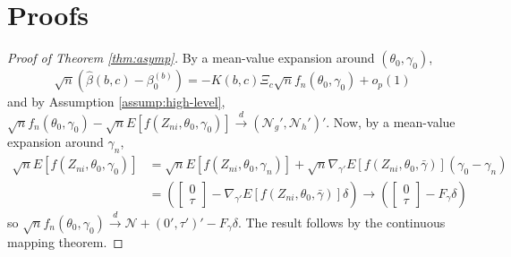 \section*{Proofs}
\begin{proof}[Proof of Theorem \ref{thm:asymp}]
By a mean-value expansion around $(\theta_0,\gamma_0)$,
	$$\sqrt{n}\left(\widehat{\beta}(b,c) - \beta_0^{(b)}\right) = - K(b,c)\Xi_c \sqrt{n} f_n(\theta_0,\gamma_0) + o_p(1)$$
  and by Assumption \ref{assump:high-level},
$\sqrt{n} f_n(\theta_0, \gamma_0) - \sqrt{n}E\left[f(Z_{ni},\theta_0, \gamma_0) \right]\overset{d}{\rightarrow} (\mathscr{N}_g', \mathscr{N}_h')'$. 
Now, by a mean-value expansion around $\gamma_n$,
	\begin{align*}
		\sqrt{n}E\left[ f(Z_{ni}, \theta_0,\gamma_0) \right] &= \sqrt{n}E\left[ f(Z_{ni}, \theta_0, \gamma_n) \right] + \sqrt{n}\nabla_{\gamma'}E\left[ f(Z_{ni}, \theta_0,\bar{\gamma}) \right] (\gamma_0 -\gamma_n)\\
			&=\left(\left[ \begin{array}{c} 0\\ \tau\end{array}\right] - \nabla_{\gamma'}E\left[ f(Z_{ni}, \theta_0, \bar{\gamma}) \right] \delta\right) \rightarrow \left(\left[ \begin{array}{c} 0\\ \tau\end{array}\right] - F_\gamma\delta\right)
	\end{align*}
  so $\sqrt{n}f_n(\theta_0, \gamma_0) \overset{d}{\rightarrow} \mathscr{N} + (0', \tau')' - F_\gamma \delta$.
  The result follows by the continuous mapping theorem.
\end{proof}


